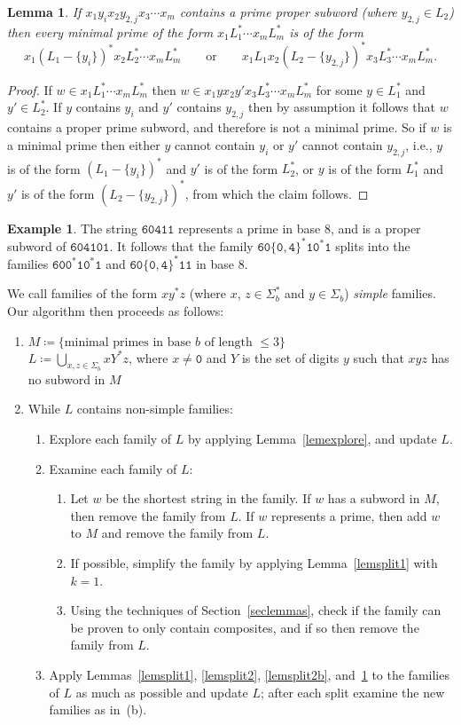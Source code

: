 \documentclass[12pt]{article}
\theoremstyle{plain}
\newtheorem{lemma}[theorem]{Lemma}
\theoremstyle{definition}
\newtheorem{example}[theorem]{Example}
\theoremstyle{remark}
\newcommand{\0}{\mathtt{0}}
\newcommand{\1}{\mathtt{1}}
\newcommand{\2}{\mathtt{2}}
\newcommand{\3}{\mathtt{3}}
\newcommand{\4}{\mathtt{4}}
\newcommand{\5}{\mathtt{5}}
\newcommand{\6}{\mathtt{6}}
\newcommand{\7}{\mathtt{7}}
\newcommand{\8}{\mathtt{8}}
\newcommand{\9}{\mathtt{9}}
\begin{document}
\begin{lemma}\label{lemsplit2c}
If $x_1y_ix_2y_{2,j}x_3\dotsm x_m$ contains a prime proper subword (where $y_{2,j}\in L_2$) then every minimal prime of the form
$x_1L_1^*\dotsm x_mL_m^*$ is of the form
\[x_1(L_1-\{y_i\})^*x_2L_2^*\dotsm x_mL_m^* \qquad\text{or}\qquad x_1L_1x_2(L_2-\{y_{2,j}\})^*x_3L_3^*\dotsm x_mL_m^* . \]
\end{lemma}
\begin{proof}
If $w\in x_1L_1^*\dotsm x_mL_m^*$ then $w\in x_1yx_2y'x_3L_3^*\dotsm x_mL_m^*$ for some $y\in L_1^*$ and $y'\in L_2^*$.
If $y$ contains $y_i$ and $y'$ contains $y_{2,j}$ then by assumption it follows that $w$ contains a proper prime subword,
and therefore is not a minimal prime.  So if $w$ is a minimal prime then either $y$ cannot contain $y_i$ or $y'$ cannot
contain $y_{2,j}$, i.e., $y$ is of the form $(L_1-\{y_i\})^*$ and $y'$ is of the form $L_2^*$, or $y$ is of the form
$L_1^*$ and $y'$ is of the form $(L_2-\{y_{2,j}\})^*$, from which the claim follows.
\end{proof}
\begin{example}
The string $\6\0\4\1\1$ represents a prime in base 8, and is a proper subword of $\6\0\4\1\0\1$.
It follows that the family $\6\0\{\0,\4\}^*\1\0^*\1$ splits into the families
$\6\0\0^*\1\0^*\1$ and $\6\0\{\0,\4\}^*\1\1$ in base 8.
\end{example}

We call families of the form $xy^*z$ (where $x$, $z\in\Sigma_b^*$ and $y\in\Sigma_b$) \emph{simple} families.
Our algorithm then proceeds as follows:
\begin{enumerate}
\item $M\coloneqq\{\text{minimal primes in base $b$ of length $\leq3$}\}$ \\
$L\coloneqq\bigcup_{x,z\in\Sigma_b}xY^*z$, where $x\neq\0$ and $Y$ is the set of digits $y$ such that $xyz$ has no subword in $M$
\item While $L$ contains non-simple families:
\begin{enumerate}
\item Explore each family of $L$ by applying Lemma~\ref{lemexplore}, and update $L$.
\item Examine each family of $L$:
\begin{enumerate}
\item Let $w$ be the shortest string in the family.  If $w$ has a subword in $M$, then remove the family from $L$.
If $w$ represents a prime, then add $w$ to $M$ and remove the family from $L$.
\item If possible, simplify the family by applying Lemma~\ref{lemsplit1} with $k=1$.
\item Using the techniques of Section~\ref{seclemmas}, check if the family can be proven to only contain
composites, and if so then remove the family from $L$.
\end{enumerate}
\item Apply Lemmas~\ref{lemsplit1}, \ref{lemsplit2}, \ref{lemsplit2b}, and~\ref{lemsplit2c} to the families of $L$ as much
as possible and update $L$; after each split examine the new families as in~(b).
\end{enumerate}
\end{enumerate}
\end{document}
